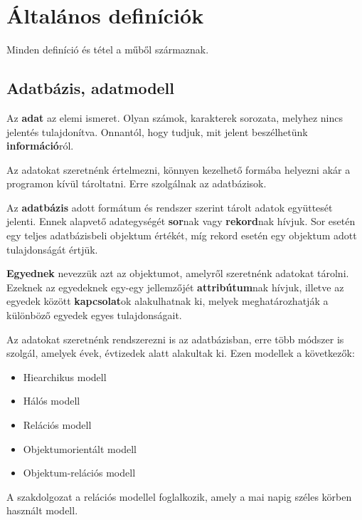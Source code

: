 \chapter{Általános definíciók}

Minden definíció és tétel a \cite{adatb} műből származnak.

\section{Adatbázis, adatmodell}

\begin{defi}[Adat]
Az \textbf{adat} az elemi ismeret. Olyan számok, karakterek sorozata, melyhez nincs jelentés tulajdonítva. Onnantól, hogy tudjuk, mit jelent beszélhetünk \textbf{információ}ról. 
\end{defi}

Az adatokat szeretnénk értelmezni, könnyen kezelhető formába helyezni akár a programon kívül tároltatni. Erre szolgálnak az adatbázisok.

\begin{defi}
Az \textbf{adatbázis} adott formátum és rendszer szerint tárolt adatok együttesét jelenti. Ennek alapvető adategységét \textbf{sor}nak vagy \textbf{rekord}nak hívjuk. Sor esetén egy teljes adatbázisbeli objektum értékét, míg rekord esetén egy objektum adott tulajdonságát értjük.
\end{defi}

\begin{defi}
\textbf{Egyednek} nevezzük azt az objektumot, amelyről szeretnénk adatokat tárolni. Ezeknek az egyedeknek egy-egy jellemzőjét \textbf{attribútum}nak hívjuk, illetve az egyedek között \textbf{kapcsolat}ok alakulhatnak ki, melyek meghatározhatják a különböző egyedek egyes tulajdonságait.
\end{defi}

Az adatokat szeretnénk rendszerezni is az adatbázisban, erre több módszer is szolgál, amelyek évek, évtizedek alatt alakultak ki. Ezen modellek a következők:
\begin{itemize}
    \item Hiearchikus modell
    \item Hálós modell
    \item Relációs modell
    \item Objektumorientált modell
    \item Objektum-relációs modell
\end{itemize}
A szakdolgozat a relációs modellel foglalkozik, amely a mai napig széles körben használt modell.

